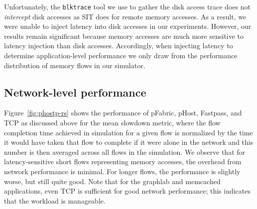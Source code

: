 Unfortunately, the \texttt{blktrace} tool we use to gather the disk access trace does not \emph{intercept} disk accesses as SIT does for remote memory accesses. As a result, we were unable to inject latency into disk accesses in our experiments. However, our results remain significant because memory accesses are much more sensitive to latency injection than disk accesses. Accordingly, when injecting latency to determine application-level performance we only draw from the performance distribution of memory flows in our simulator.




\subsection{Network-level performance}
\label{ssec:nlp}
Figure~\ref{fig:phostp-rs} shows the performance of pFabric, pHost, Fastpass, and TCP as discussed above for the mean slowdown metric, where the flow completion time achieved in simulation for a given flow is normalized by the time it would have taken that flow to complete if it were alone in the network and this number is then averaged across all flows in the simulation. We observe that for latency-sensitive short flows representing memory accesses, the overhead from network performance is minimal. For longer flows, the performance is slightly worse, but still quite good. Note that for the graphlab and memcached applications, even TCP is sufficient for good network performance; this indicates that the \dis workload is manageable.

